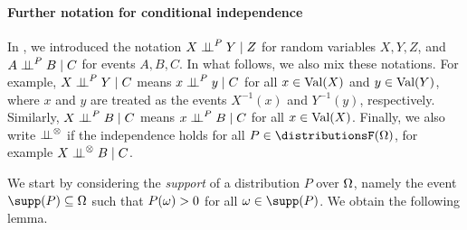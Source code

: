 \documentclass[USenglish,onecolumn]{article}
\begin{document}
\paragraph{Further notation for conditional independence}
In , we introduced the notation $X \mathrel{\perp\!\!\!\perp}^P Y \mid Z$ for random variables $X, Y, Z$, and $A \mathrel{\perp\!\!\!\perp}^P B \mid C$ for events $A, B, C$.
In what follows, we also mix these notations.
For example, $X \mathrel{\perp\!\!\!\perp}^P Y \mid C$ means $x \mathrel{\perp\!\!\!\perp}^P y \mid C$ for all $x \in \textnormal{Val}(X)$ and $y \in \textnormal{Val}(Y)$, where $x$ and $y$ are treated as the events $X^{-1}(x)$ and $Y^{-1}(y)$, respectively.
Similarly, $X \mathrel{\perp\!\!\!\perp}^P B \mid C$ means $x \mathrel{\perp\!\!\!\perp}^P B \mid C$ for all $x \in \textnormal{Val}(X)$.
Finally, we also write $\mathrel{\perp\!\!\!\perp}^\otimes$ if the independence holds for all $P \in \distributionsF(\Omg)$, for example $X \mathrel{\perp\!\!\!\perp}^\otimes B \mid C$.

We start by considering the \emph{support} of a distribution $P$ over $\Omega$, namely the event $\supp(P)\subseteq \Omg$ such that $P(\omega)>0$ for all $\omg\in\supp(P)$. We obtain the following lemma.
\end{document}
